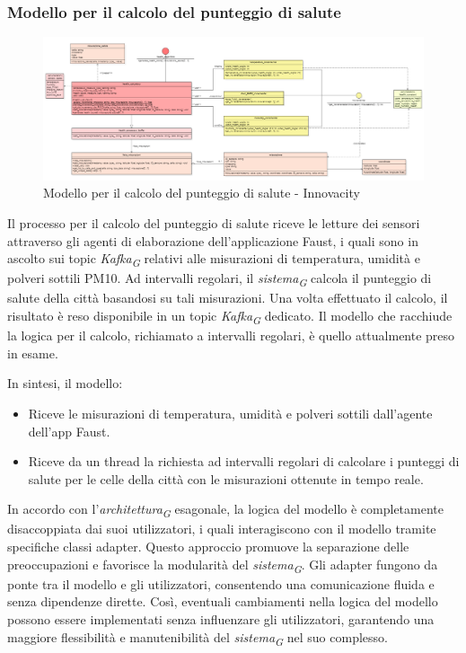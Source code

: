 \subsubsection{Modello per il calcolo del punteggio di salute}
\begin{figure}[H]
    \centering
    \includegraphics[width=1.1\textwidth]{../Images/SpecificaTecnica/healthModel.PNG}
    \caption{Modello per il calcolo del punteggio di salute - Innovacity}
    \label{fig: healthModello}
\end{figure}

Il processo per il calcolo del punteggio di salute riceve le letture dei sensori attraverso gli agenti di elaborazione dell'applicazione Faust, i quali sono in ascolto sui topic \textit{Kafka}\textsubscript{\textit{G}} relativi alle misurazioni di temperatura, umidità e polveri sottili PM10. Ad intervalli regolari, il \textit{sistema}\textsubscript{\textit{G}} calcola il punteggio di salute della città basandosi su tali misurazioni. Una volta effettuato il calcolo, il risultato è reso disponibile in un topic \textit{Kafka}\textsubscript{\textit{G}} dedicato.
Il modello che racchiude la logica per il calcolo, richiamato a intervalli regolari, è quello attualmente preso in esame.

In sintesi, il modello:
\begin{itemize}
    \item Riceve le misurazioni di temperatura, umidità e polveri sottili dall'agente dell'app Faust.
    \item Riceve da un thread la richiesta ad intervalli regolari di calcolare i punteggi di salute per le celle della città con le misurazioni ottenute in tempo reale.
\end{itemize}

In accordo con l'\textit{architettura}\textsubscript{\textit{G}} esagonale, la logica del modello è completamente disaccoppiata dai suoi utilizzatori, i quali interagiscono con il modello tramite specifiche classi adapter. Questo approccio promuove la separazione delle preoccupazioni e favorisce la modularità del \textit{sistema}\textsubscript{\textit{G}}. Gli adapter fungono da ponte tra il modello e gli utilizzatori, consentendo una comunicazione fluida e senza dipendenze dirette. Così, eventuali cambiamenti nella logica del modello possono essere implementati senza influenzare gli utilizzatori, garantendo una maggiore flessibilità e manutenibilità del \textit{sistema}\textsubscript{\textit{G}} nel suo complesso.

